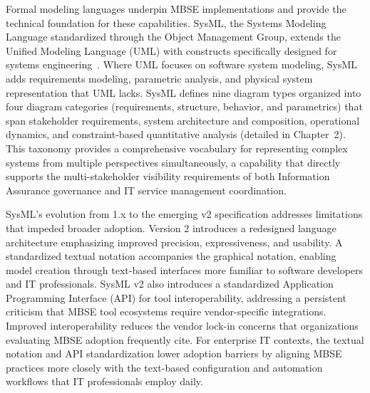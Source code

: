 Formal modeling languages underpin MBSE implementations and provide the technical foundation for these capabilities. SysML, the Systems Modeling Language standardized through the Object Management Group, extends the Unified Modeling Language (UML) with constructs specifically designed for systems engineering~\parencite{Friedenthal_Moore_Steiner_2014}. Where UML focuses on software system modeling, SysML adds requirements modeling, parametric analysis, and physical system representation that UML lacks. SysML defines nine diagram types organized into four diagram categories (requirements, structure, behavior, and parametrics) that span stakeholder requirements, system architecture and composition, operational dynamics, and constraint-based quantitative analysis (detailed in Chapter~2). This taxonomy provides a comprehensive vocabulary for representing complex systems from multiple perspectives simultaneously, a capability that directly supports the multi-stakeholder visibility requirements of both Information Assurance governance and IT service management coordination.

SysML's evolution from 1.x to the emerging v2 specification addresses limitations that impeded broader adoption. Version 2 introduces a redesigned language architecture emphasizing improved precision, expressiveness, and usability. A standardized textual notation accompanies the graphical notation, enabling model creation through text-based interfaces more familiar to software developers and IT professionals. SysML v2 also introduces a standardized Application Programming Interface (API) for tool interoperability, addressing a persistent criticism that MBSE tool ecosystems require vendor-specific integrations. Improved interoperability reduces the vendor lock-in concerns that organizations evaluating MBSE adoption frequently cite. For enterprise IT contexts, the textual notation and API standardization lower adoption barriers by aligning MBSE practices more closely with the text-based configuration and automation workflows that IT professionals employ daily.

